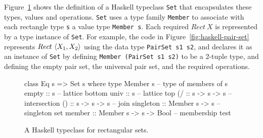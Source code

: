 Figure~\ref{fig:haskell-sets} shows the definition of a Haskell typeclass \texttt{Set} that encapsulates these types, values and operations.
\texttt{Set} uses a type family \texttt{Member} to associate with each rectangle type \texttt{s} a value type \texttt{Member~s}.
Each required $Rect~X$ is represented by a type instance of \texttt{Set}.
For example, the code in Figure~\ref{fig:haskell-pair-set} represents $Rect~\langle{X_1,X_2}\rangle$ using the data type \texttt{PairSet~s1~s2}, and declares it as an instance of \texttt{Set} by defining \texttt{Member~(PairSet~s1~s2)} to be a 2-tuple type, and defining the empty pair set, the universal pair set, and the required operations.

\begin{figure}[tb!]\centering
\begin{varwidth}{5.25in}
\begin{haskellcode}
class Eq s => Set s where
  type Member s                      -- type of members of s
  empty :: s                         -- lattice bottom
  univ  :: s                         -- lattice top
  (/\) :: s -> s -> s                -- intersection
  (\/) :: s -> s -> s                -- join
  singleton :: Member s -> s         -- singleton set
  member :: Member s -> s -> Bool    -- membership test
\end{haskellcode}
\end{varwidth}
\bottomhrule
\caption[Haskell typeclass for rectangular sets]{A Haskell typeclass for rectangular sets.}
\label{fig:haskell-sets}
\end{figure}

